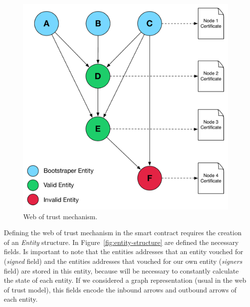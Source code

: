 \begin{figure}
  \includegraphics[width=\linewidth]{Figures/web-trust-main.pdf}
  \caption{Web of trust mechanism.}
\label{fig:web-of-trust-architecture}
\end{figure}

Defining the web of trust mechanism in the smart contract requires the creation of an \textit{Entity} structure.
In Figure~\ref{fig:entity-structure} are defined the necessary fields.
Is important to note that the entities addresses that an entity vouched for (\textit{signed} field) and the entities addresses that vouched for our own entity (\textit{signers} field) are stored in this entity, because will be necessary to constantly calculate the state of each entity.
If we considered a graph representation (usual in the web of trust model), this fields encode the inbound arrows and outbound arrows of each entity.

